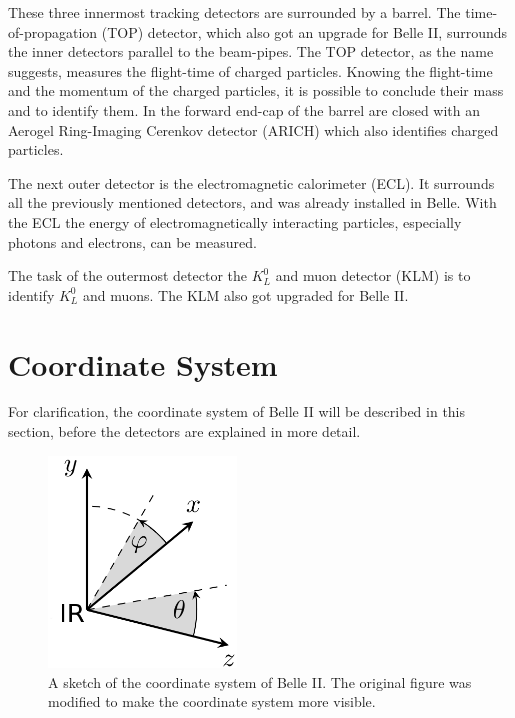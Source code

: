 \documentclass[a4paper,11pt,twosided,final,german,openbib,pdftex,listof=totoc,bibliography=totoc]{scrbook}
\begin{document}
These three innermost tracking detectors are surrounded by a barrel. The time-of-propagation (TOP) detector, which also got an upgrade for Belle II, surrounds the inner detectors parallel to the beam-pipes. The TOP detector, as the name suggests, measures the flight-time of charged particles. Knowing the flight-time and the momentum of the charged particles, it is possible to conclude their mass and to identify them. In the forward end-cap of the barrel are closed with an Aerogel Ring-Imaging Cerenkov detector (ARICH) which also identifies charged particles.

The next outer detector is the electromagnetic calorimeter (ECL). It surrounds all the previously mentioned detectors, and was already installed in Belle. With the ECL the energy of electromagnetically interacting particles, especially photons and electrons, can be measured.

The task of the outermost detector the $K_L^0$ and muon detector (KLM) is to identify $K_L^0$ and muons. The KLM also got upgraded for Belle II. \cite{B2B} 

\section{Coordinate System}

For clarification, the coordinate system of Belle II will be described in this section, before the detectors are explained in more detail.

\begin{figure}[h!]
	\begin{center}
		\includegraphics[width=5cm]{Bilder/coordinate.png}
	\end{center}
	\caption[Coordinate System Of Belle II]{A sketch of the coordinate system of Belle II. The original figure was modified to make the coordinate system more visible. \cite{TrackReconstruction}}
	\label{fig:CoordinateSysytem}
\end{figure}
\end{document}
